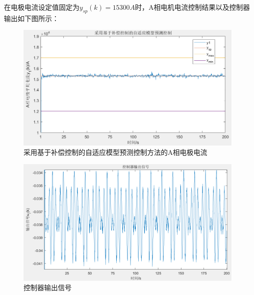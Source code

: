 \documentclass[UTF8, 12pt]{article}
\begin{document}
在电极电流设定值固定为$y_{sp}(k) = 15300A$时，A相电机电流控制结果以及控制器输出如下图所示：
\begin{figure}[H]
    \centering %
    \includegraphics[width=.8\textwidth]{figure/模型预测-阶跃信号结果.png} 
    \caption{采用基于补偿控制的自适应模型预测控制方法的A相电极电流} %
\end{figure}
\begin{figure}[H]
    \centering %
    \includegraphics[width=.8\textwidth]{figure/模型预测-控制器输出信号-阶跃.png} 
    \caption{控制器输出信号} %
\end{figure}
\end{document}
